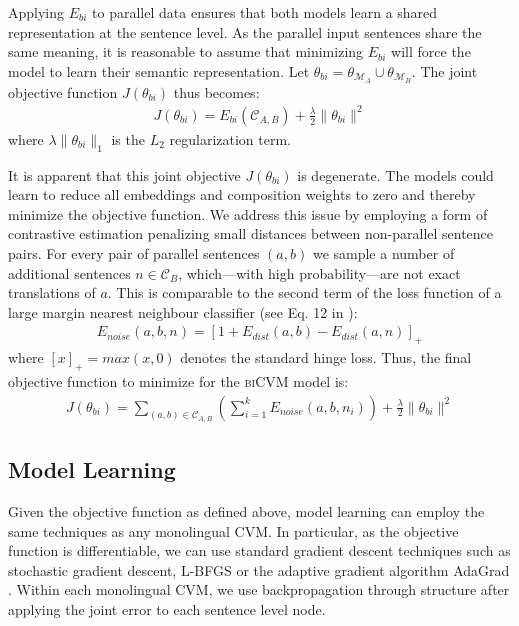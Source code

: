 \documentclass{article} \pdfoutput=1
\newcommand{\biCVM}{\textsc{biCVM}\xspace}
\newcommand{\CVM}{\textsc{CVM}\xspace}
\begin{document}
Applying $E_{bi}$ to parallel data ensures that both models learn a shared representation at the sentence level.
As the parallel input sentences share the same meaning, it is reasonable to assume that minimizing $E_{bi}$ will force the model to learn their semantic representation.
Let $\theta_{bi} = \theta_{\mathcal{M}_A} \cup \theta_{\mathcal{M}_B}$.
The joint objective function $J(\theta_{bi})$ thus becomes:
\begin{align}
J(\theta_{bi}) = E_{bi}(\mathcal{C}_{A,B}) + \frac{\lambda}{2}\|\theta_{bi}\|^2
\end{align}
where $\lambda\|\theta_{bi}\|_1$ is the $L_2$ regularization term.

It is apparent that this joint objective $J(\theta_{bi})$ is degenerate.
The models could learn to reduce all embeddings and composition weights to zero and thereby minimize the objective function.
We address this issue by employing a form of contrastive estimation penalizing small distances between non-parallel sentence pairs.
For every pair of parallel sentences $(a,b)$ we sample a number of additional sentences $n \in \mathcal{C}_B$, which---with high probability---are not exact translations of $a$.
This is comparable to the second term of the loss function of a large margin nearest neighbour classifier (see Eq. 12 in \cite{Weinberger:2009}):
\begin{align}
E_{noise}(a,b,n) = \left[1 + E_{dist}(a,b) - E_{dist}(a,n)\right]_{+}
\end{align}
where $[x]_{+} = max(x,0)$ denotes the standard hinge loss.
Thus, the final objective function to minimize for the \biCVM model is:
\begin{align}
  J(\theta_{bi})=\sum_{(a,b) \in \mathcal{C}_{A,B}} \left( \sum_{i=1}^{k}
    E_{noise}(a,b,n_i)\right) + \frac{\lambda}{2}\|\theta_{bi}\|^2
\end{align}
 \subsection{Model Learning}

Given the objective function as defined above, model learning can employ the
same techniques as any monolingual \CVM.  In particular, as the objective
function is differentiable, we can use standard gradient descent techniques such
as stochastic gradient descent, L-BFGS or the adaptive gradient algorithm
AdaGrad \cite{Duchi:2011}. Within each monolingual \CVM, we use backpropagation
through structure after applying the joint error to each sentence level node.
\end{document}

